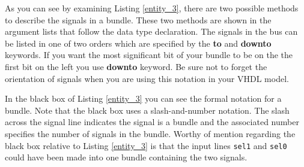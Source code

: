 As you can see by examining Listing \ref{entity_3}, there are two possible methods to describe the signals in a bundle. These two methods are shown in the argument lists that follow the data type declaration. The signals in the bus can be listed in one of two orders which are specified by the \textbf{to} and \textbf{downto} keywords. If you want the most significant bit of your bundle to be on the the first bit on the left you use \textbf{downto} keyword. Be sure not to forget the orientation of signals when you are using this notation in your VHDL model.

In the black box of Listing \ref{entity_3} you can see the formal notation for a bundle. Note that the black box uses a slash-and-number notation. The slash across the signal line indicates the signal is a bundle and the associated number specifies the number of signals in the bundle. Worthy of mention regarding the black box relative to Listing \ref{entity_3} is that the input lines \texttt{sel1} and \texttt{sel0} could have been made into one bundle containing the two signals.

